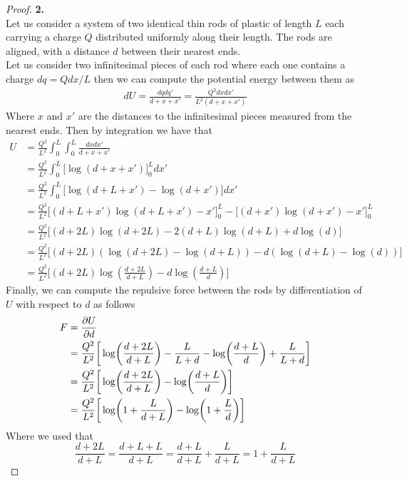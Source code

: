 \documentclass[11pt]{article}
\theoremstyle{definition}
\begin{document}
\cleardoublepage
\begin{proof}{\textbf{2.}}\\
Let us consider a system of two identical thin rods of plastic of length $L$
each carrying a charge $Q$ distributed uniformly along their length.
The rods are aligned, with a distance $d$ between their nearest ends.
\\
Let us consider two infinitesimal pieces of each rod where each one contains
a charge $dq = Qdx/L$ then we can compute the potential energy between them as
\begin{align*}
    dU = \frac{dq dq'}{d + x  + x'} = \frac{Q^2 dx dx'}{L^2(d + x  + x')}
\end{align*}
Where $x$ and $x'$ are the distances to the infinitesimal pieces measured from
the nearest ends. Then by integration we have that
\begin{align*}
    U &= \frac{Q^2}{L^2}\int_0^L \int_0^L \frac{dx dx'}{d + x  + x'}\\
    &= \frac{Q^2}{L^2}\int_0^L \bigg[\log(d + x + x')\bigg]_0^L dx'\\
    &= \frac{Q^2}{L^2}\int_0^L \bigg[\log(d + L + x') - \log(d + x')\bigg] dx'\\
    &= \frac{Q^2}{L^2}
    \bigg[(d + L + x')\log(d + L + x') - x'\bigg]_0^L
    - \bigg[(d + x')\log(d + x') - x'\bigg]_0^L\\
    &= \frac{Q^2}{L^2}
    \bigg[(d + 2L)\log(d + 2L) - 2(d + L)\log(d + L) + d\log(d)\bigg]\\
    &= \frac{Q^2}{L^2}
    \bigg[(d + 2L)(\log(d + 2L) - \log(d + L)) - d(\log(d + L) - \log(d))\bigg]\\
    &= \frac{Q^2}{L^2}
    \bigg[(d + 2L)\log(\frac{d + 2L}{d + L}) - d\log(\frac{d + L}{d})\bigg]
\end{align*}
Finally, we can compute the repulsive force between the rods by differentiation
of $U$ with respect to $d$ as follows
\begin{align*}
    F &= \pdv{U}{d}\\
    &= \frac{Q^2}{L^2}\bigg[
        \log(\frac{d + 2L}{d + L}) - \frac{L}{L + d}
        - \log(\frac{d + L}{d}) + \frac{L}{L + d}
    \bigg]\\
    &= \frac{Q^2}{L^2}\bigg[
        \log(\frac{d + 2L}{d + L}) - \log(\frac{d + L}{d})
    \bigg]\\
    &= \frac{Q^2}{L^2}\bigg[
        \log(1 + \frac{L}{d + L}) - \log(1 + \frac{L}{d})
    \bigg]
\end{align*}
Where we used that
$$\frac{d + 2L}{d + L} = \frac{d + L + L}{d + L}
= \frac{d + L}{d + L} + \frac{L}{d + L} = 1 + \frac{L}{d + L}$$
\end{proof}
\end{document}
